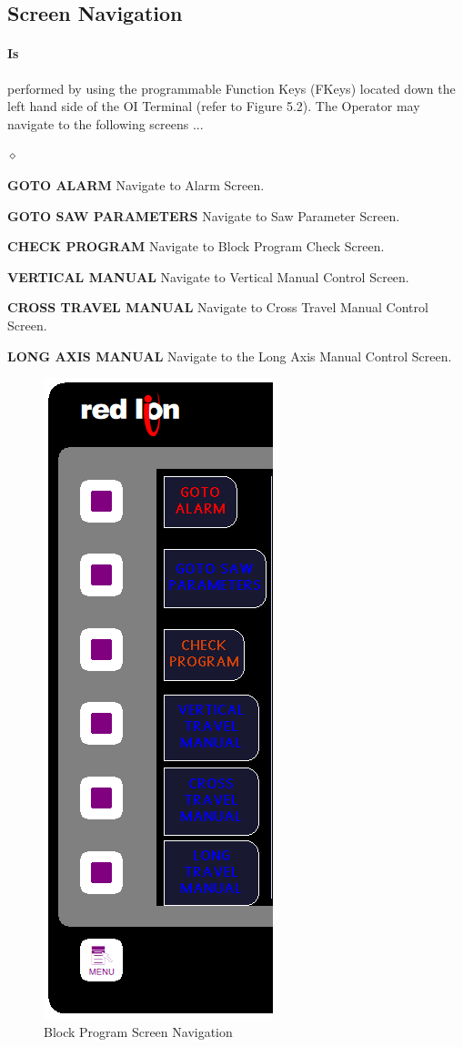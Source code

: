 \subsection{Screen Navigation}
\paragraph*{Is}performed by using the programmable Function Keys (FKeys) located down the left hand side of the OI Terminal (refer to Figure 5.2). The Operator may navigate to the following screens ...
\begin{list}{$\diamond$}{}
	\item \textbf{GOTO ALARM} Navigate to Alarm Screen.
	\item \textbf{GOTO SAW PARAMETERS} Navigate to Saw Parameter Screen.
	\item \textbf{CHECK PROGRAM} Navigate to Block Program Check Screen.
	\item \textbf{VERTICAL MANUAL} Navigate to Vertical Manual Control Screen.
	\item \textbf{CROSS TRAVEL MANUAL} Navigate to Cross Travel Manual Control Screen.
	\item \textbf{LONG AXIS MANUAL} Navigate to the Long Axis Manual Control Screen.
\end{list}
\begin{figure}
	\centering
	\includegraphics[width=0.2\linewidth]{screen-captures/program/cut-pgm-nav}
	\caption{Block Program Screen Navigation}
	\label{fig:cut-pgm-screen-nav}
\end{figure}

